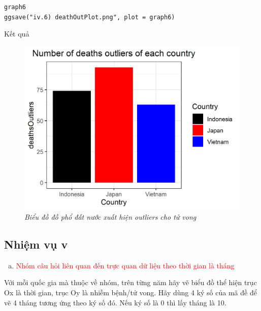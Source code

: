\documentclass[a4paper]{article}
\theoremstyle{definition}
\begin{document}
\begin{enumerate}[1)]
\begin{lstlisting}
graph6
ggsave("iv.6) deathOutPlot.png", plot = graph6)
\end{lstlisting}
Kết quả
    \begin{figure}[H]
        \begin{center}
            \includegraphics[scale=0.7]{iv/iv.6) deathOutPlot.png}
        \end{center}
        \vspace{+3mm}\caption{\it Biểu đồ đồ phổ đất nước xuất hiện outliers cho tử vong}
    \end{figure}
\end{enumerate}








\subsection{Nhiệm vụ v}
\begin{enumerate}[v)]
\item \textcolor{red}{Nhóm câu hỏi liên quan đến trực quan dữ liệu theo thời gian là tháng}
\end{enumerate}
Với mỗi quốc gia mà thuộc về nhóm, trên từng năm hãy vẽ biểu đồ thể hiện trục Ox là thời gian, trục Oy là nhiễm bệnh/tử vong. Hãy dùng 4 ký số của mã đề để vẽ 4 tháng tương ứng theo ký số đó. Nếu ký số là 0 thì lấy tháng là 10.
\end{document}
